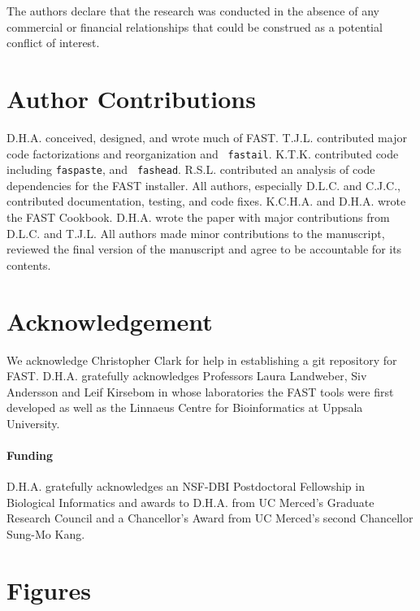 \documentclass{frontiersSCNS} %
\begin{document}
The authors declare that the research was conducted in the absence of
any commercial or financial relationships that could be construed as a
potential conflict of interest.

\section*{Author Contributions}

D.H.A. conceived, designed, and wrote much of FAST. T.J.L. contributed
major code factorizations and reorganization and {\tt
  fastail}. K.T.K. contributed code including {\tt faspaste}, and {\tt
  fashead}. R.S.L. contributed an analysis of code dependencies for
the FAST installer. All authors, especially D.L.C. and C.J.C.,
contributed documentation, testing, and code fixes. K.C.H.A. and
D.H.A. wrote the FAST Cookbook. D.H.A. wrote the paper with major
contributions from D.L.C. and T.J.L. All authors made minor
contributions to the manuscript, reviewed the final version of the
manuscript and agree to be accountable for its contents.

\section*{Acknowledgement}
We acknowledge Christopher Clark for help in establishing a git
repository for FAST. D.H.A. gratefully acknowledges Professors Laura
Landweber, Siv Andersson and Leif Kirsebom in whose laboratories the
FAST tools were first developed as well as the Linnaeus Centre for
Bioinformatics at Uppsala University.

\paragraph{Funding\textcolon} D.H.A. gratefully acknowledges an NSF-DBI
Postdoctoral Fellowship in Biological Informatics and awards to
D.H.A. from UC Merced's Graduate Research Council and a Chancellor's
Award from UC Merced's second Chancellor Sung-Mo Kang.



\section*{Figures}
\end{document}
